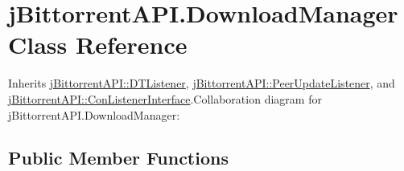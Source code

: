 \hypertarget{classj_bittorrent_a_p_i_1_1_download_manager}{
\section{jBittorrentAPI.DownloadManager Class Reference}
\label{classj_bittorrent_a_p_i_1_1_download_manager}
}


Inherits \hyperlink{interfacej_bittorrent_a_p_i_1_1_d_t_listener}{jBittorrentAPI::DTListener}, \hyperlink{interfacej_bittorrent_a_p_i_1_1_peer_update_listener}{jBittorrentAPI::PeerUpdateListener}, and \hyperlink{interfacej_bittorrent_a_p_i_1_1_con_listener_interface}{jBittorrentAPI::ConListenerInterface}.Collaboration diagram for jBittorrentAPI.DownloadManager:\subsection*{Public Member Functions}
